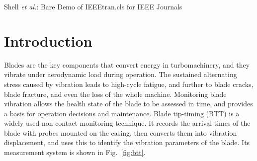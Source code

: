 \documentclass[journal,onecolumn]{IEEEtran}
\begin{document}
\markboth{}%
{Shell \MakeLowercase{\textit{et al.}}: Bare Demo of IEEEtran.cls for IEEE Journals}
% 











\maketitle

\begin{abstract}
We use the typical signal model - sum of sinusoids, as used in standard MUSIC, ESPRIT type of algorithms. And then develop a deep neural network based system, when the number of measurement samples is large. The measurement samples can be non-uniform and lower than standard Nyquist rate.  
\end{abstract} 

\begin{IEEEkeywords}

\end{IEEEkeywords}

\section{Introduction}

Blades are the key components that convert energy in turbomachinery, and they vibrate under aerodynamic load during operation\cite{wang_blade_2026}\cite{li_robust_nodate}. The sustained alternating stress caused by vibration leads to high-cycle fatigue, and further to blade cracks, blade fracture, and even the loss of the whole machine\cite{xu_time-frequency_2025}\cite{yuan_resonance_2026}. Monitoring blade vibration allows the health state of the blade to be assessed in time, and provides a basis for operation decisions and maintenance\cite{wang_blade_2026}\cite{cao_compressed_2024}\cite{jin_deep_2026}. Blade tip-timing (BTT) is a widely used non-contact monitoring technique. It records the arrival times of the blade with probes mounted on the casing, then converts them into vibration displacement, and uses this to identify the vibration parameters of the blade\cite{zablotskiy_measurement_1978}\cite{nieberding_optical_1977}. Its measurement system is shown in Fig.~\ref{fig:btt}.
\end{document}
